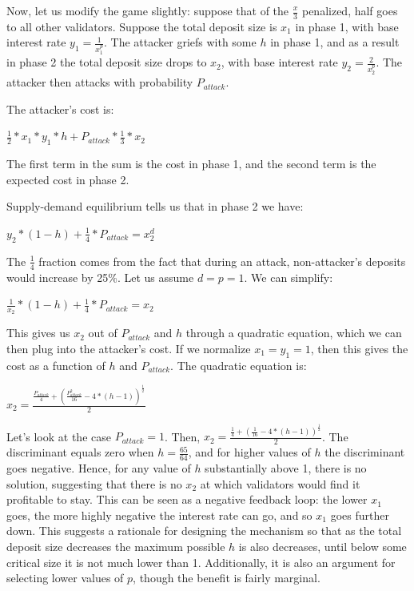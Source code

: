 \documentclass[12pt]{article}
\begin{document}
Now, let us modify the game slightly: suppose that of the $\frac{x}{3}$ penalized, half goes to all other validators. Suppose the total deposit size is $x_1$ in phase 1, with base interest rate $y_1 = \frac{1}{x_1^p}$. The attacker griefs with some $h$ in phase 1, and as a result in phase 2 the total deposit size drops to $x_2$, with base interest rate $y_2 = \frac{2}{x_2^p}$. The attacker then attacks with probability $P_{attack}$.

The attacker's cost is:

$\frac{1}{2} * x_1 * y_1 * h + P_{attack} * \frac{1}{3} * x_2$

The first term in the sum is the cost in phase 1, and the second term is the expected cost in phase 2.

Supply-demand equilibrium tells us that in phase 2 we have:

$y_2 * (1-h) + \frac{1}{4} * P_{attack} = x_2^d$

The $\frac{1}{4}$ fraction comes from the fact that during an attack, non-attacker's deposits would increase by 25\%. Let us assume $d = p = 1$. We can simplify:

$\frac{1}{x_2} * (1-h) + \frac{1}{4} * P_{attack} = x_2$

This gives us $x_2$ out of $P_{attack}$ and $h$ through a quadratic equation, which we can then plug into the attacker's cost. If we normalize $x_1 = y_1 = 1$, then this gives the cost as a function of $h$ and $P_{attack}$. The quadratic equation is:

$x_2 = \frac{\frac{P_{attack}}{4} + (\frac{P_{attack}^2}{16} - 4 * (h-1))^{\frac{1}{2}}}{2}$

Let's look at the case $P_{attack} = 1$. Then, $x_2 = \frac{\frac{1}{4} + (\frac{1}{16} - 4 * (h-1))^{\frac{1}{2}}}{2}$. The discriminant equals zero when $h = \frac{65}{64}$, and for higher values of $h$ the discriminant goes negative. Hence, for any value of $h$ substantially above 1, there is no solution, suggesting that there is no $x_2$ at which validators would find it profitable to stay. This can be seen as a negative feedback loop: the lower $x_1$ goes, the more highly negative the interest rate can go, and so $x_1$ goes further down. This suggests a rationale for designing the mechanism so that as the total deposit size decreases the maximum possible $h$ is also decreases, until below some critical size it is not much lower than 1. Additionally, it is also an argument for selecting lower values of $p$, though the benefit is fairly marginal.
\end{document}

